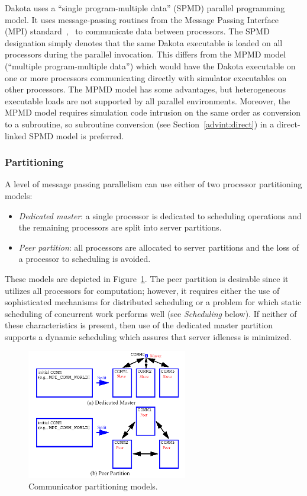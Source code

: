 Dakota uses a ``single program-multiple data'' (SPMD) parallel
programming model. It uses message-passing routines from the Message
Passing Interface (MPI) standard~\cite{Gro94},~\cite{Sni96} to
communicate data between processors. The SPMD designation simply
denotes that the same Dakota executable is loaded on all processors
during the parallel invocation. This differs from the MPMD model
(``multiple program-multiple data'') which would have the Dakota
executable on one or more processors communicating directly with
simulator executables on other processors. The MPMD model has some
advantages, but heterogeneous executable loads are not supported by
all parallel environments. Moreover, the MPMD model requires
simulation code intrusion on the same order as conversion to a
subroutine, so subroutine conversion (see Section~\ref{advint:direct})
in a direct-linked SPMD model is preferred.

\subsubsection{Partitioning}\label{parallel:SLP:message:part}

A level of message passing parallelism can use either of two processor
partitioning models:
\begin{itemize}
\item \emph{Dedicated master}: a single processor is dedicated to
scheduling operations and the remaining processors are split into
server partitions.

\item \emph{Peer partition}: all processors are allocated to server
partitions and the loss of a processor to scheduling is avoided.
\end{itemize}
These models are depicted in Figure~\ref{parallel:figure01}. The peer
partition is desirable since it utilizes all processors for
computation; however, it requires either the use of sophisticated
mechanisms for distributed scheduling or a problem for which static
scheduling of concurrent work performs well (see \emph{Scheduling}
below).  If neither of these characteristics is present, then use of
the dedicated master partition supports a dynamic scheduling which
assures that server idleness is minimized.

\begin{figure}[ht]
  \centering
  \includegraphics[width=70mm]{images/comm_partitioning}
  \caption{Communicator partitioning models.}
  \label{parallel:figure01}
\end{figure}

